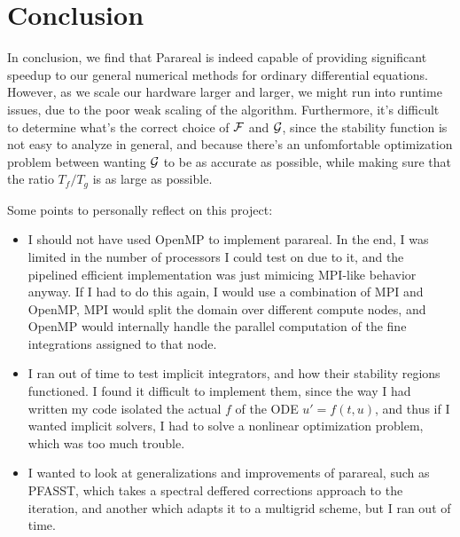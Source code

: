 \section{Conclusion}

In conclusion, we find that Parareal is indeed capable of providing significant
speedup to our general numerical methods for ordinary differential equations.
However, as we scale our hardware larger and larger, we might run into runtime
issues, due to the poor weak scaling of the algorithm. Furthermore, it's
difficult to determine what's the correct choice of $\mathcal{F}$ and $\mathcal{G}$, since
the stability function is not easy to analyze in general, and because there's an
unfomfortable optimization problem between wanting $\mathcal{G}$ to be as accurate
as possible, while making sure that the ratio $T_f/T_g$ is as large as possible.

Some points to personally reflect on this project:
\begin{itemize}
  \item I should not have used OpenMP to implement parareal. In the end, I was
    limited in the number of processors I could test on due to it, and the
    pipelined efficient implementation was just mimicing MPI-like behavior
    anyway. If I had to do this again, I would use a combination of MPI and
    OpenMP, MPI would split the domain over different compute nodes, and OpenMP
    would internally handle the parallel computation of the fine integrations
    assigned to that node.
\item I ran out of time to test implicit integrators, and how their stability
  regions functioned. I found it difficult to implement them, since the way I
  had written my code isolated the actual $f$ of the ODE $u' = f(t,u)$, and
  thus if I wanted implicit solvers, I had to solve a nonlinear optimization
  problem, which was too much trouble.
\item I wanted to look at generalizations and improvements of parareal, such as
  PFASST, which takes a spectral deffered corrections approach to the iteration,
  and another which adapts it to a multigrid scheme, but I ran out of time.
\end{itemize}
